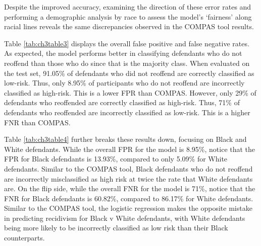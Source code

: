 \documentclass[12pt, twoside]{amherstthesis}
\begin{document}
Despite the improved accuracy, examining the direction of these error rates and performing a demographic analysis by race to assess the model's `fairness' along racial lines reveals the same discrepancies observed in the COMPAS tool results.

Table \ref{tab:ch3table3} displays the overall false positive and false negative rates. As expected, the model performs better in classifying defendants who do not reoffend than those who do since that is the majority class. When evaluated on the test set, 91.05\% of defendants who did not reoffend are correctly classified as low-risk. Thus, only 8.95\% of participants who do not reoffend are incorrectly classified as high-risk. This is a lower FPR than COMPAS. However, only 29\% of defendants who reoffended are correctly classified as high-risk. Thus, 71\% of defendants who reoffended are incorrectly classified as low-risk. This is a higher FNR than COMPAS.

Table \ref{tab:ch3table4} further breaks these results down, focusing on Black and White defendants. While the overall FPR for the model is 8.95\%, notice that the FPR for Black defendants is 13.93\%, compared to only 5.09\% for White defendants. Similar to the COMPAS tool, Black defendants who do not reoffend are incorrectly misclassified as high risk at twice the rate that White defendants are. On the flip side, while the overall FNR for the model is 71\%, notice that the FNR for Black defendants is 60.82\%, compared to 86.17\% for White defendants. Similar to the COMPAS tool, the logistic regression makes the opposite mistake in predicting recidivism for Black v White defendants, with White defendants being more likely to be incorrectly classified as low risk than their Black counterparts.
\end{document}
